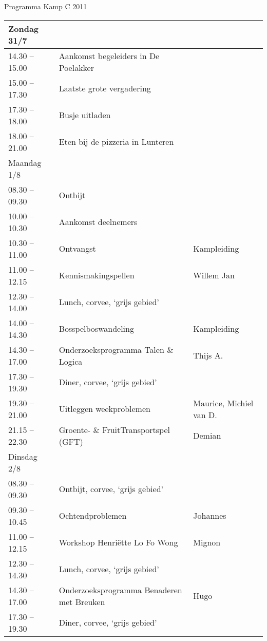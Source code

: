 \parindent=0mm
\pagestyle{empty}


\begin{center}
\begin{Large}
Programma Kamp C 2011
\end{Large}
\end{center}

\begin{center}
\begin{small}
\begin{tabular}{|l|l|l|}
\hline
Zondag 31/7 & & \\
\hline
14.30 -- 15.00 & Aankomst begeleiders in De Poelakker & \\
15.00 -- 17.30 & Laatste grote vergadering & \\
17.30 -- 18.00 & Busje uitladen & \\
18.00 -- 21.00 & Eten bij de pizzeria in Lunteren & \\
\hline
Maandag 1/8 & & \\
\hline
08.30 -- 09.30 & Ontbijt & \\
10.00 -- 10.30 & Aankomst deelnemers & \\
10.30 -- 11.00 & Ontvangst & Kampleiding\\
11.00 -- 12.15 & Kennismakingspellen & Willem Jan \\
12.30 -- 14.00 & Lunch, corvee, `grijs gebied' & \\
14.00 -- 14.30 & Bosspelboswandeling & Kampleiding\\
14.30 -- 17.00 & Onderzoeksprogramma Talen \& Logica & Thijs A.\\
17.30 -- 19.30 & Diner, corvee, `grijs gebied' & \\
19.30 -- 21.00 & Uitleggen weekproblemen & Maurice, Michiel van D.\\
21.15 -- 22.30 & Groente- \& FruitTransportspel (GFT) & Demian \\
\hline
Dinsdag 2/8 & & \\
\hline
08.30 -- 09.30 & Ontbijt, corvee, `grijs gebied' & \\
09.30 -- 10.45 & Ochtendproblemen & Johannes\\
11.00 -- 12.15 & Workshop Henri\"ette Lo Fo Wong & Mignon\\
12.30 -- 14.30 & Lunch, corvee, `grijs gebied' & \\
14.30 -- 17.00 & Onderzoeksprogramma Benaderen met Breuken & Hugo\\
17.30 -- 19.30 & Diner, corvee, `grijs gebied' & \\

\end{tabular}
\end{small}
\end{center}
